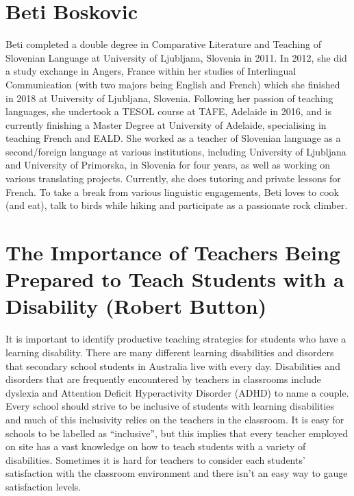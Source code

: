 \documentclass[twoside,12pt,a4paper,notitlepage]{memoir}
\begin{document}
\section*{Beti Boskovic}

Beti completed a double degree in Comparative Literature and Teaching of Slovenian Language at University of Ljubljana, Slovenia in 2011. In 2012, she did a study exchange in Angers, France within her studies of Interlingual Communication (with two majors being English and French) which she finished in 2018 at University of Ljubljana, Slovenia. Following her passion of teaching languages, she undertook a TESOL course at TAFE, Adelaide in 2016, and is currently finishing a Master Degree at University of Adelaide, specialising in teaching French and EALD.
She worked as a teacher of Slovenian language as a second/foreign language at various institutions, including University of Ljubljana and University of Primorska, in Slovenia for four years, as well as working on various translating projects. Currently, she does tutoring and private lessons for French.
To take a break from various linguistic engagements, Beti loves to cook (and eat), talk to birds while hiking and participate as a passionate rock climber.


\pagebreak
\section*{The Importance of Teachers Being Prepared to Teach Students with a Disability (Robert Button)}
\label{aut:button}


It is important to identify productive teaching strategies for students who have a learning disability. There are many different learning disabilities and disorders that secondary school students in Australia live with every day. Disabilities and disorders that are frequently encountered by teachers in classrooms include dyslexia and Attention Deficit Hyperactivity Disorder (ADHD) to name a couple. Every school should strive to be inclusive of students with learning disabilities and much of this inclusivity relies on the teachers in the classroom. It is easy for schools to be labelled as “inclusive”, but this implies that every teacher employed on site has a vast knowledge on how to teach students with a variety of disabilities. Sometimes it is hard for teachers to consider each students’ satisfaction with the classroom environment and there isn’t an easy way to gauge satisfaction levels.
\end{document}
